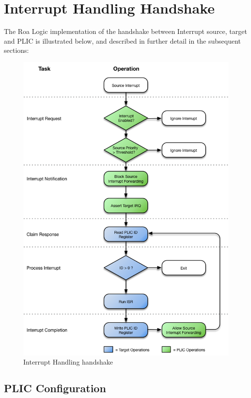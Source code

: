 \section{Interrupt Handling Handshake}

The Roa Logic implementation of the handshake between Interrupt source,
target and PLIC is illustrated below, and described in further detail in
the subsequent sections:

\begin{figure}[!htb]

\includegraphics{img/plic-handshake.png}
\caption{Interrupt Handling handshake}
\label{fig:HANDSHAKE}
\end{figure}

\subsection{PLIC Configuration}

